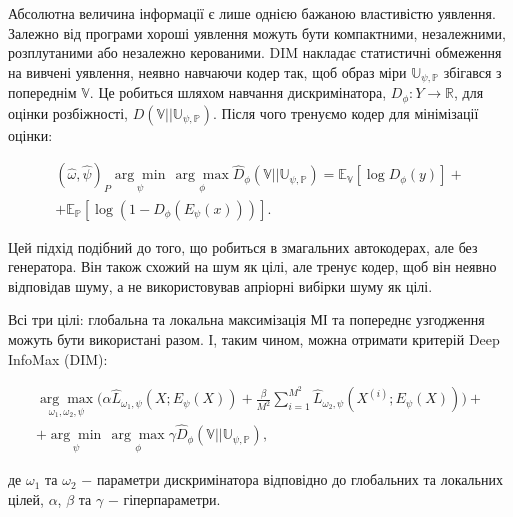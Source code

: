Абсолютна величина інформації є лише однією бажаною властивістю уявлення. Залежно від програми хороші уявлення можуть бути компактними, незалежними, розплутаними або незалежно керованими. DIM накладає статистичні обмеження на вивчені уявлення, неявно навчаючи кодер так, щоб образ міри $\mathbb{U_{\psi, P}}$ збігався з попереднім $\mathbb{V}$. Це робиться шляхом навчання дискримінатора, $D_{\phi} : Y \rightarrow \mathbb{R}$, для оцінки розбіжності, $D(\mathbb{V} || \mathbb{U_{\psi, P}})$. Після чого тренуємо кодер для мінімізації оцінки:

\begin{eqnarray}\label{eq:div}
(\hat{\omega}, \hat{\psi})_{P} \underset{\psi}{\arg\min}\,\underset{\phi}{\arg\max}\hat{D}_{\phi}(\mathbb{V}||\mathbb{U_{\psi,P}}) = \mathbb{E_{V}}[\log{D_{\phi}(y)}] + \\ + \mathbb{E_{P}}[\log{(1-D_{\phi}(E_{\psi}(x)))}].
\end{eqnarray}

\vspace{1.5em}

Цей підхід подібний до того, що робиться в змагальних автокодерах, але без генератора. Він також схожий на шум як цілі, але тренує кодер, щоб він неявно відповідав шуму, а не використовував апріорні вибірки шуму як цілі.

Всі три цілі: глобальна та локальна максимізація МІ та попереднє узгодження можуть бути використані разом. І, таким чином, можна отримати критерій Deep InfoMax (DIM):

\begin{eqnarray}\label{eq:deepinfomax}
\underset{\omega_{1},\omega_{2},\psi}{\arg\max}(\alpha \hat{L}_{\omega_{1},\psi}(X; E_{\psi}(X)) + \frac{\beta}{M^{2}}\sum_{i=1}^{M^{2}}{\hat{L}_{\omega_{2}, \psi}(X^{(i)}; E_{\psi}(X)))} + \\
+ \underset{\psi}{\arg\min}\,\underset{\phi}{\arg\max}\gamma\hat{D}_{\phi}(\mathbb{V}||\mathbb{U_{\psi,P}}),
\end{eqnarray}

\noindent де $\omega_{1}$ та $\omega_{2}$ $-$ параметри дискримінатора відповідно до глобальних \newline
\hspace*{15pt}та локальних цілей, \newline
\hspace*{15pt}$\alpha$, $\beta$ та $\gamma$ $-$ гіперпараметри.

